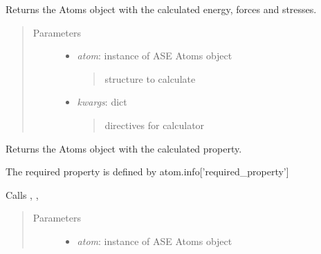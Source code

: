 \documentclass[letterpaper,10pt,english]{sphinxmanual}
\begin{document}
\begin{fulllineitems}
\begin{fulllineitems}
\end{fulllineitems}


\begin{fulllineitems}
\label{classes:catcalc.CATCalc.calc_efs}
Returns the Atoms object with the calculated energy, forces and 
stresses.
\begin{quote}\begin{description}
\item[{Parameters}] \leavevmode\begin{itemize}
\item {} 
\emph{atom}: instance of ASE Atoms object
\begin{quote}

structure to calculate
\end{quote}

\item {} 
\emph{kwargs}: dict
\begin{quote}

directives for calculator
\end{quote}

\end{itemize}

\end{description}\end{quote}

\end{fulllineitems}


\begin{fulllineitems}
\label{classes:catcalc.CATCalc.calculate}
Returns the Atoms object with the calculated property.

The required property is defined by atom.info{[}'required\_property'{]}

Calls {\hyperref[classes:catcalc.CATCalc.calc_ebs]{}}, {\hyperref[classes:catcalc.CATCalc.calc_efs]{}}, {\hyperref[classes:catcalc.CATCalc.calc_def_ene]{}}
\begin{quote}\begin{description}
\item[{Parameters}] \leavevmode\begin{itemize}
\item {} 
\emph{atom}: instance of ASE Atoms object
\begin{quote}


\end{quote}
\end{itemize}
\end{description}
\end{quote}
\end{fulllineitems}
\end{fulllineitems}
\end{document}
